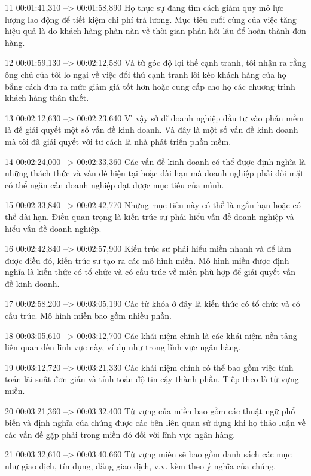 11
00:01:41,310 --> 00:01:58,890
Họ thực sự đang tìm cách giảm quy mô lực lượng lao động để tiết kiệm chi phí trả lương.  Mục tiêu cuối cùng của việc tăng hiệu quả là do khách hàng phàn nàn về thời gian phản hồi lâu để hoàn thành đơn hàng.

12
00:01:59,130 --> 00:02:12,580
Và từ góc độ lợi thế cạnh tranh, tôi nhận ra rằng ông chủ của tôi lo ngại về việc đối thủ cạnh tranh lôi kéo khách hàng của họ bằng cách đưa ra mức giảm giá tốt hơn hoặc cung cấp cho họ các chương trình khách hàng thân thiết.

13
00:02:12,630 --> 00:02:23,640
Vì vậy sở dĩ doanh nghiệp đầu tư vào phần mềm là để giải quyết một số vấn đề kinh doanh.  Và đây là một số vấn đề kinh doanh mà tôi đã giải quyết với tư cách là nhà phát triển phần mềm.

14
00:02:24,000 --> 00:02:33,360
Các vấn đề kinh doanh có thể được định nghĩa là những thách thức và vấn đề hiện tại hoặc dài hạn mà doanh nghiệp phải đối mặt có thể ngăn cản doanh nghiệp đạt được mục tiêu của mình.

15
00:02:33,840 --> 00:02:42,770
Những mục tiêu này có thể là ngắn hạn hoặc có thể dài hạn.  Điều quan trọng là kiến ​​trúc sư phải hiểu vấn đề doanh nghiệp và hiểu vấn đề doanh nghiệp.

16
00:02:42,840 --> 00:02:57,900
Kiến trúc sư phải hiểu miền nhanh và để làm được điều đó, kiến ​​trúc sư tạo ra các mô hình miền.  Mô hình miền được định nghĩa là kiến ​​thức có tổ chức và có cấu trúc về miền phù hợp để giải quyết vấn đề kinh doanh.

17
00:02:58,200 --> 00:03:05,190
Các từ khóa ở đây là kiến ​​thức có tổ chức và có cấu trúc.  Mô hình miền bao gồm nhiều phần.

18
00:03:05,610 --> 00:03:12,700
Các khái niệm chính là các khái niệm nền tảng liên quan đến lĩnh vực này, ví dụ như trong lĩnh vực ngân hàng.

19
00:03:12,720 --> 00:03:21,330
Các khái niệm chính có thể bao gồm việc tính toán lãi suất đơn giản và tính toán độ tin cậy thành phần.  Tiếp theo là từ vựng miền.

20
00:03:21,360 --> 00:03:32,400
Từ vựng của miền bao gồm các thuật ngữ phổ biến và định nghĩa của chúng được các bên liên quan sử dụng khi họ thảo luận về các vấn đề gặp phải trong miền đó đối với lĩnh vực ngân hàng.

21
00:03:32,610 --> 00:03:40,660
Từ vựng miền sẽ bao gồm danh sách các mục như giao dịch, tín dụng, đăng giao dịch, v.v. kèm theo ý nghĩa của chúng.

